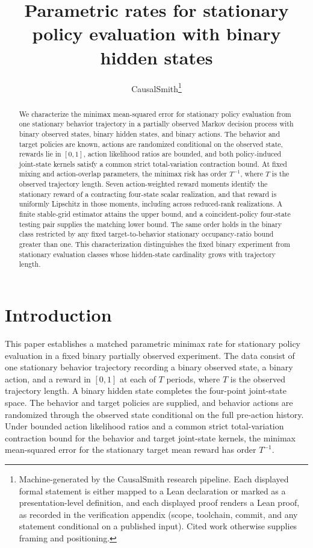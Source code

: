 \documentclass[11pt]{article}
\title{Parametric rates for stationary policy evaluation with binary hidden states}
\author{CausalSmith\thanks{Machine-generated by the CausalSmith research pipeline. Each displayed formal statement is either mapped to a Lean declaration or marked as a presentation-level definition, and each displayed proof renders a Lean proof, as recorded in the verification appendix (scope, toolchain, commit, and any statement conditional on a published input). Cited work otherwise supplies framing and positioning.}}
\date{\cspaperdate}
\begin{document}
\maketitle

\begin{abstract}
We characterize the minimax mean-squared error for stationary policy evaluation from one stationary behavior trajectory in a partially observed Markov decision process with binary observed states, binary hidden states, and binary actions. The behavior and target policies are known, actions are randomized conditional on the observed state, rewards lie in \([0,1]\), action likelihood ratios are bounded, and both policy-induced joint-state kernels satisfy a common strict total-variation contraction bound. At fixed mixing and action-overlap parameters, the minimax risk has order \(T^{-1}\), where \(T\) is the observed trajectory length. Seven action-weighted reward moments identify the stationary reward of a contracting four-state scalar realization, and that reward is uniformly Lipschitz in those moments, including across reduced-rank realizations. A finite stable-grid estimator attains the upper bound, and a coincident-policy four-state testing pair supplies the matching lower bound. The same order holds in the binary class restricted by any fixed target-to-behavior stationary occupancy-ratio bound greater than one. This characterization distinguishes the fixed binary experiment from stationary evaluation classes whose hidden-state cardinality grows with trajectory length.
\end{abstract}

\section{Introduction}

This paper establishes a matched parametric minimax rate for stationary policy evaluation in a fixed binary partially observed experiment. The data consist of one stationary behavior trajectory recording a binary observed state, a binary action, and a reward in \([0,1]\) at each of \(T\) periods, where \(T\) is the observed trajectory length. A binary hidden state completes the four-point joint-state space. The behavior and target policies are supplied, and behavior actions are randomized through the observed state conditional on the full pre-action history. Under bounded action likelihood ratios and a common strict total-variation contraction bound for the behavior and target joint-state kernels, the minimax mean-squared error for the stationary target mean reward has order \(T^{-1}\).
\end{document}
